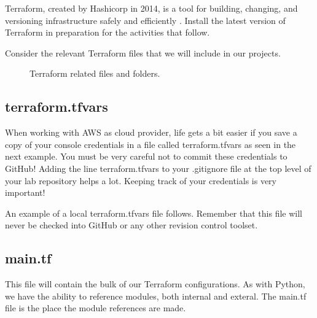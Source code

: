 \justify
Terraform, created by Hashicorp in 2014, is a tool for building, changing, and versioning infrastructure safely and efficiently . Install the latest version of Terraform in preparation for the activities that follow.

\justify
Consider the relevant Terraform files that we will include in our
projects.

\begin{figure}[!htb]
	
	\caption{Terraform related files and folders.}
\end{figure}

\subsection{terraform.tfvars}

When working with AWS as cloud provider, life gets a bit easier if you
save a copy of your console credentials in a file called
terraform.tfvars as seen in the next example. You must be very careful
not to commit these credentials to GitHub! Adding the line
terraform.tfvars to your .gitignore file at the top level of your lab
repository helps a lot. Keeping track of your credentials is very
important!

\justify
An example of a local terraform.tfvars file follows. Remember that this
file will never be checked into GitHub or any other revision control
toolset.

\begin{Shaded}
   \begin{Highlighting}[]
   \end{Highlighting}
\end{Shaded}


\subsection{main.tf}

\justify
This file will contain the bulk of our Terraform configurations. As with
Python, we have the ability to reference modules, both internal and
exteral. The main.tf file is the place the module references are made.

